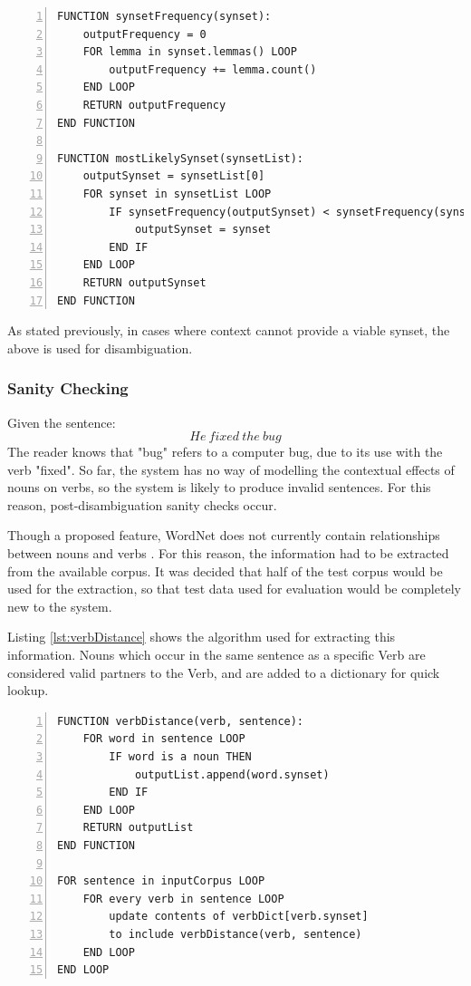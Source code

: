 \documentclass[]{article}
\begin{document}
\begin{lstlisting}[numbers=left, numberstyle=\small, caption={The synsetFrequency and mostLikelySynset functions}, captionpos=b, label={lst:synsetFrequency}]
FUNCTION synsetFrequency(synset):
    outputFrequency = 0
    FOR lemma in synset.lemmas() LOOP
        outputFrequency += lemma.count()
    END LOOP
    RETURN outputFrequency
END FUNCTION

FUNCTION mostLikelySynset(synsetList):
    outputSynset = synsetList[0]
    FOR synset in synsetList LOOP
        IF synsetFrequency(outputSynset) < synsetFrequency(synset) THEN
            outputSynset = synset
        END IF
    END LOOP
    RETURN outputSynset
END FUNCTION
\end{lstlisting}

As stated previously, in cases where context cannot provide a viable synset, the above is used for disambiguation.

\subsubsection{Sanity Checking}
\label{Sanity}
Given the sentence:
\[He\: fixed\: the\: bug\]
The reader knows that "bug" refers to a computer bug, due to its use with the verb "fixed". So far, the system has no way of modelling the contextual effects of nouns on verbs, so the system is likely to produce invalid sentences. For this reason, post-disambiguation sanity checks occur.

Though a proposed feature, WordNet does not currently contain relationships between nouns and verbs \cite{WN4Verbs}. For this reason, the information had to be extracted from the available corpus. It was decided that half of the test corpus would be used for the extraction, so that test data used for evaluation would be completely new to the system.

Listing \ref{lst:verbDistance} shows the algorithm used for extracting this information. Nouns which occur in the same sentence as a specific Verb are considered valid partners to the Verb, and are added to a dictionary for quick lookup.

\begin{lstlisting}[numbers=left, numberstyle=\small, caption={The noun-verb relationship learning algorithm}, captionpos=b, label={lst:verbDistance}]
FUNCTION verbDistance(verb, sentence):
	FOR word in sentence LOOP
		IF word is a noun THEN
			outputList.append(word.synset)
		END IF
	END LOOP
	RETURN outputList
END FUNCTION			

FOR sentence in inputCorpus LOOP
	FOR every verb in sentence LOOP
		update contents of verbDict[verb.synset] 
		to include verbDistance(verb, sentence)
	END LOOP
END LOOP
\end{lstlisting}
\end{document}

